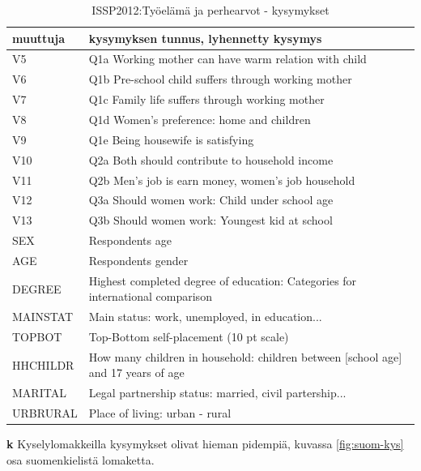 \documentclass[
  finnish,
]{book}
\begin{document}
\begin{table}

\caption{\label{tab:vartable1}ISSP2012:Työelämä ja perhearvot - kysymykset}
\centering
\begin{tabular}[t]{ll}
\toprule
muuttuja & kysymyksen tunnus, lyhennetty kysymys\\
\midrule
V5 & Q1a Working mother can have warm relation with child\\
V6 & Q1b Pre-school child suffers through working mother\\
V7 & Q1c Family life suffers through working mother\\
V8 & Q1d Women’s preference: home and children\\
V9 & Q1e Being housewife is satisfying\\
\addlinespace
V10 & Q2a Both should contribute to household income\\
V11 & Q2b Men’s job is earn money, women’s job household\\
V12 & Q3a Should women work: Child under school age\\
V13 & Q3b Should women work: Youngest kid at school\\
SEX & Respondents age\\
\addlinespace
AGE & Respondents gender\\
DEGREE & Highest completed degree of education: Categories for international comparison\\
MAINSTAT & Main status: work, unemployed, in education...\\
TOPBOT & Top-Bottom self-placement (10 pt scale)\\
HHCHILDR & How many children in household: children between [school age] and 17 years of age\\
\addlinespace
MARITAL & Legal partnership status: married, civil partership...\\
URBRURAL & Place of living: urban - rural\\
\bottomrule
\end{tabular}
\end{table}

\textbf{k} Kyselylomakkeilla kysymykset olivat hieman pidempiä, kuvassa \ref{fig:suom-kys} osa suomenkielistä lomaketta.
\end{document}
